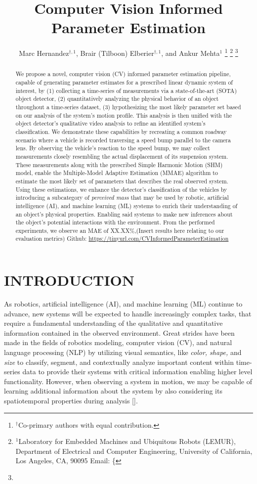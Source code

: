 \documentclass[letterpaper, 10 pt, conference]{ieeeconf}  %
\title{\LARGE \bf
Computer Vision Informed Parameter Estimation
}
\author{
    Marc Hernandez$^{\dagger,1}$, Brair (Tilboon) Elberier$^{\dagger,1}$, and Ankur Mehta$^1$
    \thanks{$^{\dagger}$Co-primary authors with equal contribution.}
    \thanks{$^1$Laboratory for Embedded Machines and Ubiquitous Robots (LEMUR), Department of Electrical and Computer Engineering, University of California, Los Angeles, CA, 90095
    Email: \{\fontfamily{qcr}\selectfont{ \large marchernandez, tilboon, mehtank\}@ucla.edu}}
    \thanks{}
}
\begin{document}
\maketitle
\thispagestyle{empty}
\pagestyle{empty}


\begin{abstract}
We propose a novel, computer vision (CV) informed parameter estimation pipeline, capable of generating parameter estimates for a prescribed linear dynamic system of interest, by (1) collecting a time-series of measurements via a state-of-the-art (SOTA) object detector, (2) quantitatively analyzing the physical behavior of an object throughout a time-series dataset, (3) hypothesizing the most likely parameter set based on our analysis of the system's motion profile. This analysis is then unified with the object detector's qualitative video analysis to refine an identified system's classification. We demonstrate these capabilities by recreating a common roadway scenario where a vehicle is recorded traversing a speed bump parallel to the camera lens. By observing the vehicle's reaction to the speed bump, we may collect measurements closely resembling the actual displacement of its suspension system. These measurements along with the prescribed Simple Harmonic Motion (SHM) model, enable the Multiple-Model Adaptive Estimation (MMAE) algorithm to estimate the most likely set of parameters that describes the real observed system. Using these estimations, we enhance the detector's classification of the vehicles by introducing a subcategory of \textit{perceived mass} that may be used by robotic, artificial intelligence (AI), and machine learning (ML) systems to enrich their understanding of an object's physical properties. Enabling said systems to make new inferences about the object's potential interactions with the environment. From the performed experiments, we observe an MAE of XX.XX\%,(Insert results here relating to our evaluation metrics) Github: \url{https://tinyurl.com/CVInformedParameterEstimation}
\end{abstract}


\section{INTRODUCTION}
As robotics, artificial intelligence (AI), and machine learning (ML) continue to advance, new systems will be expected to handle increasingly complex tasks, that require a fundamental understanding of the qualitative and quantitative information contained in the observed environment.  Great strides have been made in the fields of robotics modeling, computer vision (CV), and natural language processing (NLP) by utilizing visual semantics, like \textit{color, shape,} and \textit{size} to classify, segment, and contextually analyze important content within time-series data to provide their systems with critical information enabling higher level functionality. However, when observing a system in motion, we may be capable of learning additional information about the system by also considering its spatiotemporal properties during analysis []. 
\end{document}
